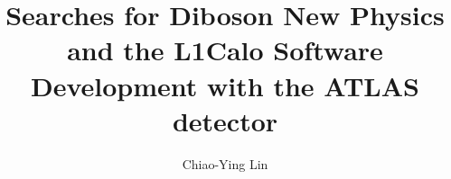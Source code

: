 \documentclass[hyperpdf,bindnopdf]{hepthesis}
\title{Searches for Diboson New Physics and the L1Calo Software Development with the ATLAS detector}
\author{Chiao-Ying Lin}
\begin{document}
\begin{frontmatter}
    
\end{frontmatter}
	
\begin{mainmatter}
	\begin{spacing}{1.4}
    
    \let\cleardoublepage\clearpage
    
	\let\cleardoublepage\clearpage
 	
 	\let\cleardoublepage\clearpage
 	
 	\let\cleardoublepage\clearpage
 	
 	\let\cleardoublepage\clearpage
 	
    \let\cleardoublepage\clearpage
 	
 	\let\cleardoublepage\clearpage
 	\end{spacing}
\end{mainmatter}
	
	\begin{appendices}
		
		
	\end{appendices}
	
	\begin{backmatter}
		
	\end{backmatter}
	
\end{document}
